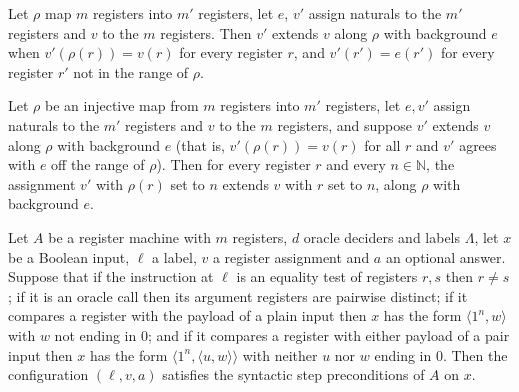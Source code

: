\begin{definition}
\label{Complexity.LogProg.RegExt}
\leanok
Let $\rho$ map $m$ registers into $m'$ registers, let $e$, $v'$ assign naturals to the $m'$
registers and $v$ to the $m$ registers. Then $v'$ extends $v$ along $\rho$ with background $e$
when $v'(\rho(r))=v(r)$ for every register $r$, and $v'(r')=e(r')$ for every register $r'$ not
in the range of $\rho$.
\end{definition}

\begin{lemma}
\label{Complexity.LogProg.RegExt.update}
\leanok
{}
Let $\rho$ be an injective map from $m$ registers into $m'$ registers, let $e,v'$ assign
naturals to the $m'$ registers and $v$ to the $m$ registers, and suppose $v'$ extends $v$ along
$\rho$ with background $e$ (that is, $v'(\rho(r))=v(r)$ for all $r$ and $v'$ agrees with $e$
off the range of $\rho$). Then for every register $r$ and every $n\in\mathbb N$, the assignment
$v'$ with $\rho(r)$ set to $n$ extends $v$ with $r$ set to $n$, along $\rho$ with background
$e$.
\end{lemma}

\begin{lemma}
\label{Complexity.LogProg.preS_of_ins}
\leanok
{}
Let $A$ be a register machine with $m$ registers, $d$ oracle deciders and labels $\Lambda$, let
$x$ be a Boolean input, $\ell$ a label, $v$ a register assignment and $a$ an optional answer.
Suppose that if the instruction at $\ell$ is an equality test of registers $r,s$ then
$r\ne s$; if it is an oracle call then its argument registers are pairwise distinct; if it
compares a register with the payload of a plain input then $x$ has the form
$\langle 1^n,w\rangle$ with $w$ not ending in $0$; and if it compares a register with
either payload of a pair input then $x$ has the form $\langle 1^n,\langle u,w\rangle\rangle$
with neither $u$ nor $w$ ending in $0$. Then the configuration $(\ell,v,a)$ satisfies the syntactic
step preconditions of $A$ on $x$.
\end{lemma}


